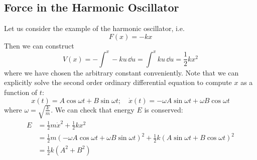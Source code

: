 \documentclass{article}
\begin{document}
\subsection{Force in the Harmonic Oscillator}
Let us consider the example of the harmonic oscillator, i.e.
\[ F(x) = -kx \]
Then we can construct
\[ V(x) = -\int^x -ku \,\dd u = \int^x ku \,\dd u = \frac{1}{2} kx^2 \]
where we have chosen the arbitrary constant conveniently. Note that we can explicitly solve the second order ordinary differential equation to compute $x$ as a function of $t$:
\[ x(t) = A\cos \omega t + B\sin \omega t;\quad \dot x(t) = -\omega A \sin \omega t + \omega B \cos \omega t \]
where $\omega = \sqrt{\frac{k}{m}}$. We can check that energy $E$ is conserved:
\begin{align*}
    E & = \frac{1}{2}m\dot x^2 + \frac{1}{2}kx^2                                                                                                         \\
      & = \frac{1}{2}m \left( -\omega A \cos \omega t + \omega B \sin \omega t \right)^2 + \frac{1}{2}k \left( A\sin \omega t + B\cos \omega t \right)^2 \\
      & = \frac{1}{2}k(A^2 + B^2)
\end{align*}
\end{document}
